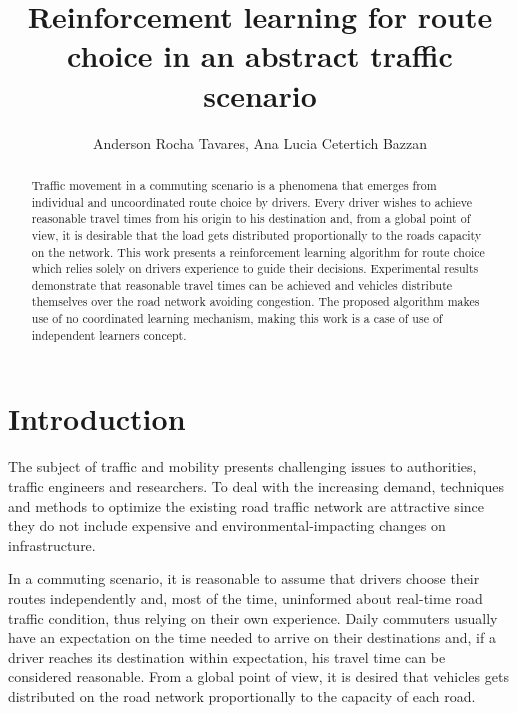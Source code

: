 \documentclass[12pt]{article}
\title{Reinforcement learning for route choice in an abstract traffic scenario}
\author{
  Anderson Rocha Tavares\inst{1}, Ana Lucia Cetertich Bazzan\inst{1}
}
\begin{document}
\maketitle

\begin{abstract}
Traffic movement in a commuting scenario is a phenomena that emerges from individual and uncoordinated route choice by drivers. Every driver wishes to achieve reasonable travel times from his origin to his destination and, from a global point of view, it is desirable that the load gets distributed proportionally to the roads capacity on the network. This work presents a reinforcement learning algorithm for route choice which relies solely on drivers experience to guide their decisions. Experimental results demonstrate that reasonable travel times can be achieved and vehicles distribute themselves over the road network avoiding congestion. The proposed algorithm makes use of no coordinated learning mechanism, making this work is a case of use of independent learners concept.
\end{abstract}





\section{Introduction}
The subject of traffic and mobility presents challenging issues to authorities, traffic engineers and researchers. To deal with the increasing demand, techniques and methods to optimize the existing road traffic network are attractive since they do not include expensive and environmental-impacting changes on infrastructure.

In a commuting scenario, it is reasonable to assume that drivers choose their routes independently and, most of the time, uninformed about real-time road traffic condition, thus relying on their own experience. Daily commuters usually have an expectation on the time needed to arrive on their destinations and, if a driver reaches its destination within expectation, his travel time can be considered  reasonable. From a global point of view, it is desired that vehicles gets distributed on the road network proportionally to the capacity of each road. %
\end{document}
